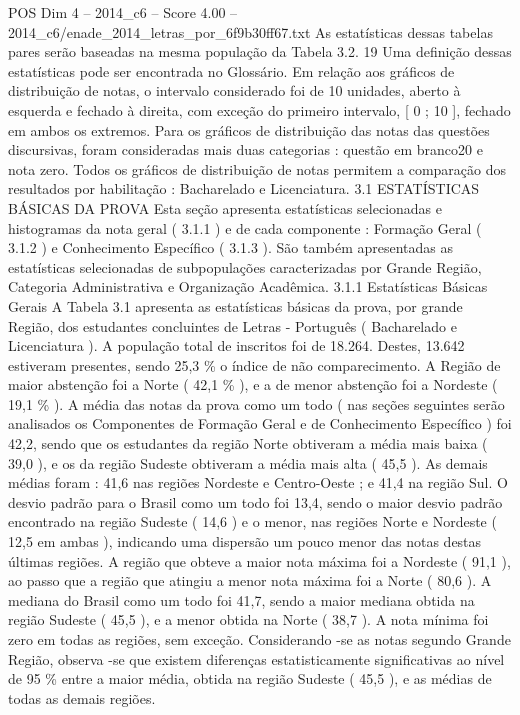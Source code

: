 \begin{textsample}{POS Dim 4 – 2014\_c6 – Score 4.00 – 2014\_c6/enade\_2014\_letras\_por\_6f9b30ff67.txt}
As estatísticas dessas tabelas pares serão baseadas na mesma população da Tabela 3.2. 19 Uma definição dessas estatísticas pode ser encontrada no Glossário.
Em relação aos gráficos de distribuição de notas, o intervalo considerado foi de 10 unidades, aberto à esquerda e fechado à direita, com exceção do primeiro intervalo, [ 0 ; 10 ], fechado em ambos os extremos.
Para os gráficos de distribuição das notas das questões discursivas, foram consideradas mais duas categorias : questão em branco20 e nota zero.
Todos os gráficos de distribuição de notas permitem a comparação dos resultados por habilitação : Bacharelado e Licenciatura. 3.1 ESTATÍSTICAS BÁSICAS DA PROVA Esta seção apresenta estatísticas selecionadas e histogramas da nota geral ( 3.1.1 ) e de cada componente : Formação Geral ( 3.1.2 ) e Conhecimento Específico ( 3.1.3 ).
São também apresentadas as estatísticas selecionadas de subpopulações caracterizadas por Grande Região, Categoria Administrativa e Organização Acadêmica. 3.1.1 Estatísticas Básicas Gerais A Tabela 3.1 apresenta as estatísticas básicas da prova, por grande Região, dos estudantes concluintes de Letras - Português ( Bacharelado e Licenciatura ).
A população total de inscritos foi de 18.264.
Destes, 13.642 estiveram presentes, sendo 25,3 \% o índice de não comparecimento.
A Região de maior abstenção foi a Norte ( 42,1 \% ), e a de menor abstenção foi a Nordeste ( 19,1 \% ).
A média das notas da prova como um todo ( nas seções seguintes serão analisados os Componentes de Formação Geral e de Conhecimento Específico ) foi 42,2, sendo que os estudantes da região Norte obtiveram a média mais baixa ( 39,0 ), e os da região Sudeste obtiveram a média mais alta ( 45,5 ).
As demais médias foram : 41,6 nas regiões Nordeste e Centro-Oeste ; e 41,4 na região Sul.
O desvio padrão para o Brasil como um todo foi 13,4, sendo o maior desvio padrão encontrado na região Sudeste ( 14,6 ) e o menor, nas regiões Norte e Nordeste ( 12,5 em ambas ), indicando uma dispersão um pouco menor das notas destas últimas regiões.
A região que obteve a maior nota máxima foi a Nordeste ( 91,1 ), ao passo que a região que atingiu a menor nota máxima foi a Norte ( 80,6 ).
A mediana do Brasil como um todo foi 41,7, sendo a maior mediana obtida na região Sudeste ( 45,5 ), e a menor obtida na Norte ( 38,7 ).
A nota mínima foi zero em todas as regiões, sem exceção.
Considerando -se as notas segundo Grande Região, observa -se que existem diferenças estatisticamente significativas ao nível de 95 \% entre a maior média, obtida na região Sudeste ( 45,5 ), e as médias de todas as demais regiões.

\end{textsample}
